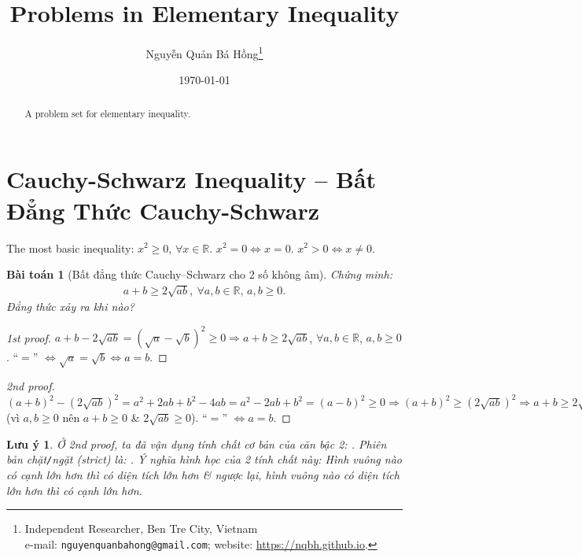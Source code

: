 \documentclass{article}
\title{Problems in Elementary Inequality}
\author{Nguyễn Quản Bá Hồng\footnote{Independent Researcher, Ben Tre City, Vietnam\\e-mail: \texttt{nguyenquanbahong@gmail.com}; website: \url{https://nqbh.github.io}.}}
\date{\today}
\newtheorem{baitoan}{Bài toán}
\newtheorem{luuy}{Lưu ý}
\begin{document}
\maketitle
\begin{abstract}
	A problem set for elementary inequality.
\end{abstract}
\tableofcontents


\section{Cauchy-Schwarz Inequality -- Bất Đẳng Thức Cauchy-Schwarz}
The most basic inequality: $x^2\ge0$, $\forall x\in\mathbb{R}$. $x^2 = 0\Leftrightarrow x = 0$. $x^2 > 0\Leftrightarrow x\ne0$.

\begin{baitoan}[Bất đẳng thức Cauchy--Schwarz cho 2 số không âm]
	Chứng minh:
	\begin{align*}
		\boxed{a + b\ge2\sqrt{ab},\ \forall a,b\in\mathbb{R},\,a,b\ge 0.}
	\end{align*}
	Đẳng thức xảy ra khi nào?
\end{baitoan}

\begin{proof}[1st proof]
	$a + b - 2\sqrt{ab} = (\sqrt{a} - \sqrt{b})^2\ge0\Rightarrow a + b\ge2\sqrt{ab}$, $\forall a,b\in\mathbb{R}$, $a,b\ge 0$. ``$=$'' $\Leftrightarrow\sqrt{a} = \sqrt{b}\Leftrightarrow a = b$.
\end{proof}

\begin{proof}[2nd proof]
	$(a + b)^2 - (2\sqrt{ab})^2 = a^2 + 2ab + b^2 - 4ab = a^2 - 2ab + b^2 = (a - b)^2\ge0\Rightarrow(a + b)^2\ge(2\sqrt{ab})^2\Rightarrow a + b\ge2\sqrt{ab}$ (vì $a,b\ge0$ nên $a + b\ge0$ \& $2\sqrt{ab}\ge0$). ``$=$'' $\Leftrightarrow a = b$.
\end{proof}

\begin{luuy}
	Ở 2nd proof, ta đã vận dụng tính chất cơ bản của căn bậc 2: . Phiên bản chặt\emph{\texttt{/}}ngặt (strict) là: . Ý nghĩa hình học của 2 tính chất này: Hình vuông nào có cạnh lớn hơn thì có diện tích lớn hơn \& ngược lại, hình vuông nào có diện tích lớn hơn thì có cạnh lớn hơn.
\end{luuy}
\end{document}
